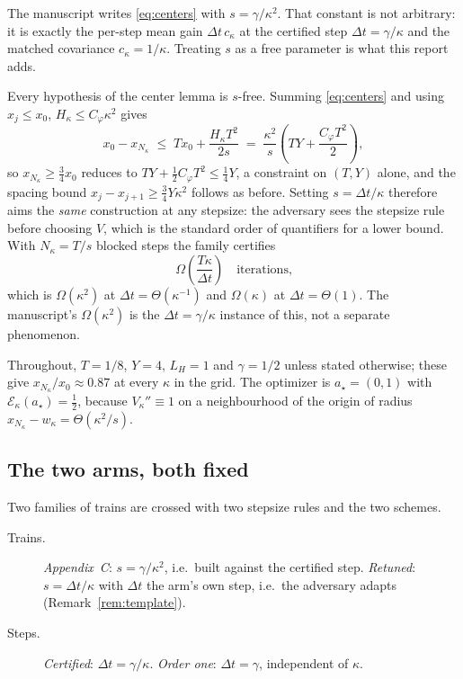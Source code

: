 \documentclass[11pt]{article}
\newcommand{\calE}{\mathcal{E}}
\begin{document}
The manuscript writes \eqref{eq:centers} with $s=\gamma/\kappa^2$. That constant is
not arbitrary: it is exactly the per-step mean gain $\Delta t\,c_\kappa$ at the
certified step $\Delta t=\gamma/\kappa$ and the matched covariance
$c_\kappa=1/\kappa$. Treating $s$ as a free parameter is what this report adds.

\begin{remark}
\label{rem:template}
Every hypothesis of the center lemma is $s$-free. Summing \eqref{eq:centers} and
using $x_j\le x_0$, $H_\kappa\le C_\varphi\kappa^2$ gives
\[
    x_0-x_{N_\kappa}
    \;\le\; T x_0+\frac{H_\kappa T^2}{2s}
    \;=\;\frac{\kappa^2}s\left(TY+\frac{C_\varphi T^2}2\right),
\]
so $x_{N_\kappa}\ge\tfrac34x_0$ reduces to $TY+\tfrac12C_\varphi T^2\le\tfrac14Y$,
a constraint on $(T,Y)$ alone, and the spacing bound
$x_j-x_{j+1}\ge\tfrac34Y\kappa^2$ follows as before. Setting $s=\Delta t/\kappa$
therefore aims the \emph{same} construction at any stepsize: the adversary sees the
stepsize rule before choosing $V$, which is the standard order of quantifiers for a
lower bound. With $N_\kappa=T/s$ blocked steps the family certifies
\[
    \Omega\!\left(\frac{T\kappa}{\Delta t}\right)
    \quad\text{iterations,}
\]
which is $\Omega(\kappa^2)$ at $\Delta t=\Theta(\kappa^{-1})$ and $\Omega(\kappa)$ at
$\Delta t=\Theta(1)$. The manuscript's $\Omega(\kappa^2)$ is the $\Delta t=\gamma/\kappa$
instance of this, not a separate phenomenon.
\end{remark}

Throughout, $T=1/8$, $Y=4$, $L_H=1$ and $\gamma=1/2$ unless stated otherwise; these
give $x_{N_\kappa}/x_0\approx0.87$ at every $\kappa$ in the grid. The optimizer is
$a_\star=(0,1)$ with $\calE_\kappa(a_\star)=\tfrac12$, because $V_\kappa''\equiv1$ on
a neighbourhood of the origin of radius $x_{N_\kappa}-w_\kappa=\Theta(\kappa^2/s)$.

\subsection{The two arms, both fixed}
\label{subsec:arms}

Two families of trains are crossed with two stepsize rules and the two schemes.

\begin{description}
\item[Trains.] \emph{Appendix~C}: $s=\gamma/\kappa^2$, i.e.\ built against the
    certified step. \emph{Retuned}: $s=\Delta t/\kappa$ with $\Delta t$ the arm's
    own step, i.e.\ the adversary adapts (Remark~\ref{rem:template}).
\item[Steps.] \emph{Certified}: $\Delta t=\gamma/\kappa$. \emph{Order one}:
    $\Delta t=\gamma$, independent of $\kappa$.
\end{description}
\end{document}
